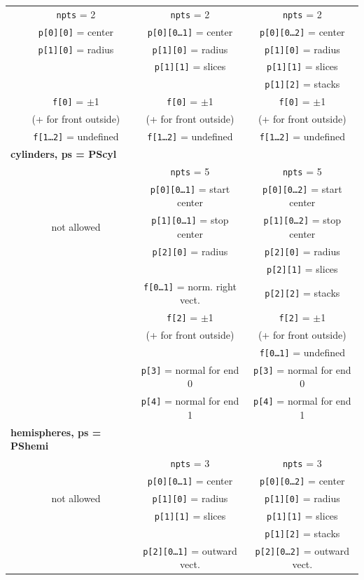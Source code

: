 \documentclass {scrbook}
\newcommand {\ttt} {\texttt}
\begin{document}
\begin{longtable}[c]{lccc}
&\ttt{npts} = 2&\ttt{npts} = 2&\ttt{npts} = 2\\ 
&\ttt{p[0][0]} = center&\ttt{p[0][0\ldots1]} = center&\ttt{p[0][0\ldots2]} = center\\ 
&\ttt{p[1][0]} = radius&\ttt{p[1][0]} = radius&\ttt{p[1][0]} = radius\\ 
&&\ttt{p[1][1]} = slices&\ttt{p[1][1]} = slices\\ 
&&&\ttt{p[1][2]} = stacks\\ 
&\ttt{f[0]} = $\pm$1&\ttt{f[0]} = $\pm$1&\ttt{f[0]} = $\pm$1\\ 
&(+ for front outside)&(+ for front outside)&(+ for front outside)\\ 
&\ttt{f[1\ldots2]} = undefined&\ttt{f[1\ldots2]} = undefined&\ttt{f[1\ldots2]} = undefined\\
\hline
\multicolumn{2}{l}{\textbf{cylinders, ps = PScyl}}\\
&&\ttt{npts} = 5&\ttt{npts} = 5\\ 
&&\ttt{p[0][0\ldots1]} = start center&\ttt{p[0][0\ldots2]} = start center\\ 
&not allowed&\ttt{p[1][0\ldots1]} = stop center&\ttt{p[1][0\ldots2]} = stop center\\ 
&&\ttt{p[2][0]} = radius&\ttt{p[2][0]} = radius\\ 
&&&\ttt{p[2][1]} = slices\\ 
&&\ttt{f[0\ldots1]} = norm. right vect.&\ttt{p[2][2]} = stacks\\ 
&&\ttt{f[2]} = $\pm$1&\ttt{f[2]} = $\pm$1\\ 
&&(+ for front outside)&(+ for front outside)\\ 
&&&\ttt{f[0\ldots1]} = undefined\\
&&\ttt{p[3]} = normal for end 0&\ttt{p[3]} = normal for end 0\\
&&\ttt{p[4]} = normal for end 1&\ttt{p[4]} = normal for end 1\\
\hline
\multicolumn{2}{l}{\textbf{hemispheres, ps = PShemi}}\\
&&\ttt{npts} = 3&\ttt{npts} = 3\\ 
&&\ttt{p[0][0\ldots1]} = center&\ttt{p[0][0\ldots2]} = center\\ 
&not allowed&\ttt{p[1][0]} = radius&\ttt{p[1][0]} = radius\\ 
&&\ttt{p[1][1]} = slices&\ttt{p[1][1]} = slices\\ 
&&&\ttt{p[1][2]} = stacks\\ 
&&\ttt{p[2][0\ldots1]} = outward vect.&\ttt{p[2][0\ldots2]} = outward vect.\\ 

\end{longtable}
\end{document}
